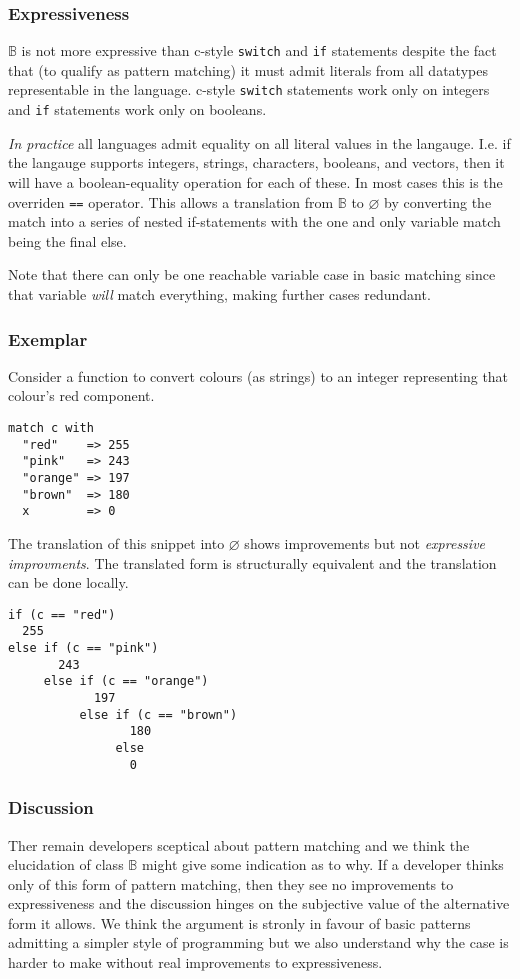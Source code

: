 \documentclass[acmsmall]{acmart}
\begin{document}
\subsubsection{Expressiveness}
$\mathbb{B}$ is not more expressive than c-style \lstinline{switch} and \lstinline{if} statements despite the fact that (to qualify as pattern matching) it must admit literals from all datatypes representable in the language.  c-style \lstinline{switch} statements work only on integers and \lstinline{if} statements work only on booleans.

\emph{In practice} all languages admit equality on all literal values in the langauge.  I.e. if the langauge supports integers, strings, characters, booleans, and vectors, then it will have a boolean-equality operation for each of these.  In most cases this is the overriden \lstinline{==} operator.  This allows a translation from $\mathbb{B}$ to $\varnothing$ by converting the match into a series of nested if-statements with the one and only variable match being the final else.

Note that there can only be one reachable variable case in basic matching since that variable \emph{will} match everything, making further cases redundant.

\subsubsection{Exemplar}

Consider a function to convert colours (as strings) to an integer representing that colour's red component.
\begin{lstlisting}
match c with
  "red"    => 255
  "pink"   => 243
  "orange" => 197
  "brown"  => 180
  x        => 0  
\end{lstlisting}
The translation of this snippet into $\varnothing$ shows improvements but not \emph{expressive improvments}.  The translated form is structurally equivalent and the translation can be done locally.
\begin{lstlisting}
if (c == "red")
  255
else if (c == "pink")
       243
     else if (c == "orange")
            197
          else if (c == "brown")
                 180
               else 
                 0
\end{lstlisting}
    
\subsubsection{Discussion}
Ther remain developers sceptical about pattern matching and we think the elucidation of class $\mathbb{B}$ might give some indication as to why.  If a developer thinks only of this form of pattern matching, then they see no improvements to expressiveness and the discussion hinges on the subjective value of the alternative form it allows.  We think the argument is stronly in favour of basic patterns admitting a simpler style of programming but we also understand why the case is harder to make without real improvements to expressiveness.
\end{document}
